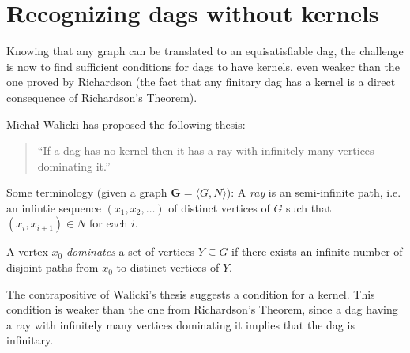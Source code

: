 
\section{Recognizing dags without kernels}
\label{sec:Recognizing dags without kernels}
Knowing that any graph can be translated to an equisatisfiable dag, the challenge is now to find sufficient conditions for dags to have kernels, even weaker than the one proved by Richardson (the fact that any finitary dag has a kernel is a direct consequence of Richardson's Theorem).

Michał Walicki has proposed the following thesis:
\begin{quote}
  ``If a dag has no kernel then it has a ray with infinitely many vertices dominating it.''
\end{quote}
Some terminology (given a graph $\mathbf{G} = \langle G,N \rangle$):
A \textit{ray} is an semi-infinite path, i.e. an infintie sequence $(x_1, x_2, \dots)$ of distinct vertices of $G$ such that $(x_i,x_{i+1}) \in N$ for each $i$.

A vertex $x_0$ \textit{dominates} a set of vertices $Y \subseteq G$ if there exists an infinite number of disjoint paths from $x_0$ to distinct vertices of $Y$.

The contrapositive of Walicki's thesis suggests a condition for a kernel.
This condition is weaker than the one from Richardson's Theorem, since a dag having a ray with infinitely many vertices dominating it implies that the dag is infinitary.
